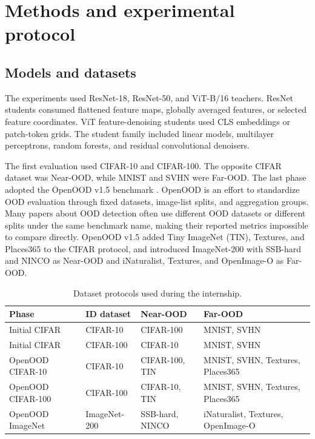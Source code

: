 \section{Methods and experimental protocol}

\subsection{Models and datasets}

\headingindent
The experiments used ResNet-18, ResNet-50, and ViT-B/16 teachers. ResNet
students consumed flattened feature maps, globally averaged features, or
selected feature coordinates. ViT feature-denoising students used CLS
embeddings or patch-token grids. The student family included linear models,
multilayer perceptrons, random forests, and residual convolutional denoisers.

The first evaluation used CIFAR-10 and CIFAR-100. The
opposite CIFAR dataset was Near-OOD, while MNIST and SVHN were Far-OOD. The
last phase adopted the OpenOOD v1.5 benchmark \cite{zhang2023openood}. OpenOOD
is an effort to standardize OOD evaluation through fixed datasets, image-list
splits, and aggregation groups. Many papers about OOD detection often use
different OOD datasets or different splits under the same benchmark name,
making their reported metrics impossible to compare directly. OpenOOD v1.5
added Tiny ImageNet (TIN), Textures, and Places365 to the CIFAR protocol, and
introduced ImageNet-200 with SSB-hard and NINCO as Near-OOD and iNaturalist,
Textures, and OpenImage-O as Far-OOD.

\begin{table}[ht]
\centering
{}
\begin{tabularx}{\textwidth}{@{}L{2.2cm}L{2.9cm}YY@{}}
\toprule
Phase & ID dataset & Near-OOD & Far-OOD \\
\midrule
Initial CIFAR & CIFAR-10 & CIFAR-100 & MNIST, SVHN \\
Initial CIFAR & CIFAR-100 & CIFAR-10 & MNIST, SVHN \\
OpenOOD CIFAR-10 & CIFAR-10 & CIFAR-100, TIN & MNIST, SVHN, Textures,
Places365 \\
OpenOOD CIFAR-100 & CIFAR-100 & CIFAR-10, TIN & MNIST, SVHN, Textures,
Places365 \\
OpenOOD ImageNet & ImageNet-200 & SSB-hard, NINCO & iNaturalist, Textures,
OpenImage-O \\
\bottomrule
\end{tabularx}
\caption{Dataset protocols used during the internship.}
\label{tab:dataset-protocols}
\end{table}

